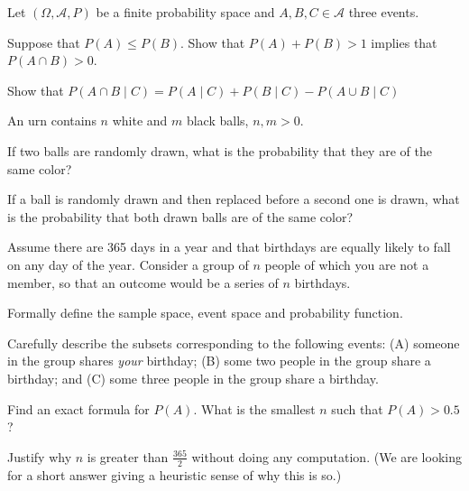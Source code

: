\documentclass[a4paper,10pt,landscape,twocolumn]{scrartcl}
\begin{document}
\begin{exercise}[]
Let $(\Omega, \mathcal{A}, P)$ be a finite probability space and $A, B, C\in \mathcal A$ three events.
	\begin{subex}
		Suppose that $P(A) \le P(B)$. Show that $P(A) + P(B) > 1$ implies that $P(A\cap B) > 0$.
	\end{subex}
	
	\begin{subex}
		Show that $P(A \cap B \mid C) = {P}(A\mid C) + {P}(B\mid C) - {P}(A \cup B \mid C)$ %
	\end{subex}
\end{exercise}

\begin{exercise}[]
	 An urn contains $n$ white and $m$ black balls, $n, m > 0$.
	
	\begin{subex}
		If two balls are randomly drawn, what is the probability that they are of the same color?		
	\end{subex}
	
	\begin{subex}
		If a ball is randomly drawn and then replaced before a second one is drawn, what is the probability that both drawn balls are of the same color?
	\end{subex}
		
\end{exercise}

\begin{exercise}[Birthdays]
	Assume there are 365 days in a year and that birthdays are equally likely to fall on any day of the year. Consider a group of $n$ people of which you are not a member, so that an outcome would be a series of $n$ birthdays.
	\begin{subex}
		Formally define the sample space, event space and probability function.
	\end{subex}
	
	\begin{subex}
		Carefully describe the subsets corresponding to the following events: (A) someone in the group shares \emph{your} birthday; (B) some two people in the group share a birthday; and (C) some three people in the group share a birthday.
	\end{subex}
	
	\begin{subex}
	Find an exact formula for $P(A)$. What is the smallest $n$ such that $P(A) > 0.5$?	
	\end{subex}
	
	\begin{subex}
	Justify why $n$ is greater than $\frac{3	65}{2}$ without doing any computation. (We are looking for a short answer giving a heuristic sense of why this is so.)
	\end{subex}
\end{exercise}
\end{document}
